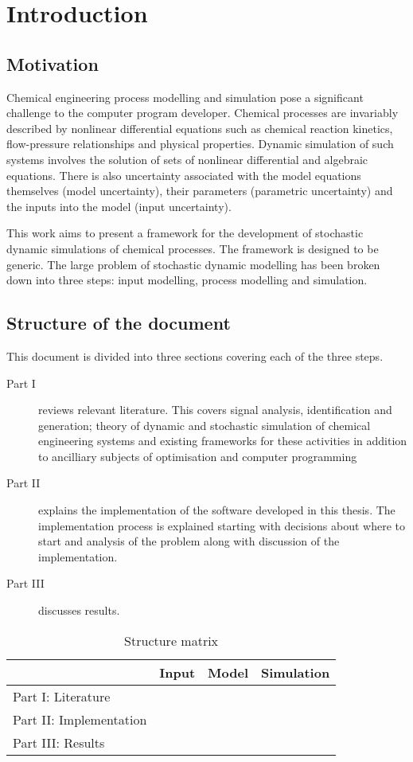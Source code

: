 \chapter{Introduction}\label{chap:intro}

\section{Motivation}
Chemical engineering process modelling and simulation pose a significant challenge to the computer program developer.  
Chemical processes are invariably described by nonlinear differential equations such as chemical reaction kinetics, flow-pressure relationships and physical properties.  
Dynamic simulation of such systems involves the solution of sets of nonlinear differential and algebraic equations.
There is also uncertainty associated with the model equations themselves (model uncertainty), their parameters (parametric uncertainty) and the inputs into the model (input uncertainty).

This work aims to present a framework for the development of stochastic dynamic simulations of chemical processes. 
The framework is designed to be generic. 
The large problem of stochastic dynamic modelling has been broken down into three steps: input modelling, process modelling and simulation.

\section{Structure of the document}
This document is divided into three sections covering each of the three steps.
\begin{description}
\item[Part I] reviews relevant literature.  
	This covers signal analysis, identification and generation; theory of dynamic and stochastic simulation of chemical engineering systems and existing frameworks for these activities in addition to ancilliary subjects of optimisation and computer programming
\item[Part II] explains the implementation of the software developed in this thesis.  The implementation process is explained starting with decisions about where to start and analysis of the problem along with discussion of the implementation.
\item[Part III] discusses results.  
\end{description}

\begin{table}[htbp]
  \centering
  \begin{tabular}{llll}
    \toprule
                            & Input & Model & Simulation \\
    \midrule
    Part I: Literature      &       &       &            \\
    Part II: Implementation &       &       &            \\
    Part III: Results       &       &       &            \\
    \bottomrule
  \end{tabular}
  \caption{Structure matrix}
  \label{tab:structure}
\end{table}

